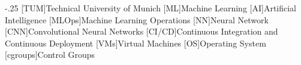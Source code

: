 \documentclass[headsepline,footsepline,footinclude=false,oneside,fontsize=11pt,paper=a4,listof=totoc,bibliography=totoc]{scrbook} %
\begin{document}


\frontmatter{}





\tableofcontents{}

\mainmatter{}







%
\appendix{}


\begin{acronym}
	\itemsep-.25\baselineskip
	[TUM]{Technical University of Munich}
	[ML]{Machine Learning}
	[AI]{Artificial Intelligence}
	[MLOps]{Machine Learning Operations}
	[NN]{Neural Network}
	[CNN]{Convolutional Neural Networks}
	[CI/CD]{Continuous Integration and Continuous Deployment}
	[VMs]{Virtual Machines}
	[OS]{Operating System}
	[cgroups]{Control Groups}
\end{acronym}

\listoffigures{}
\listoftables{}
\printbibliography{}
\end{document}

